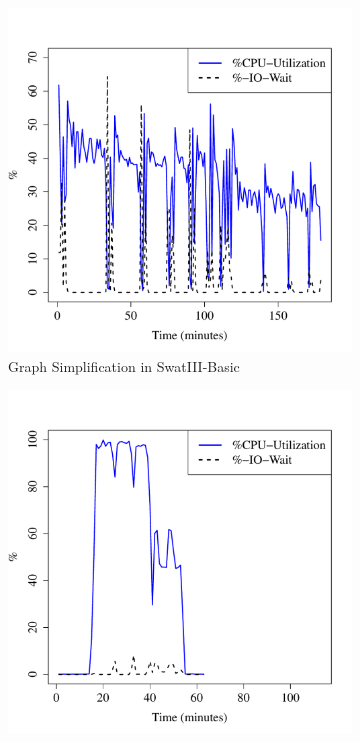 \documentclass[conference]{IEEEtran}
\begin{document}
\begin{figure}[htb]
\begin{subfigure}[b]{0.23\textwidth}
                \includegraphics[width=\textwidth]{Figure/SystemData/Plots/ECCPUHDD.pdf}
                \caption{Graph Simplification in SwatIII-Basic}
                \label{fig:ECCPUHDD}
        \end{subfigure} 
        \begin{subfigure}[b]{0.23\textwidth}
                \includegraphics[width=\textwidth]{Figure/SystemData/Plots/BGCPUSSD.pdf}

\end{subfigure}
\end{figure}
\end{document}
